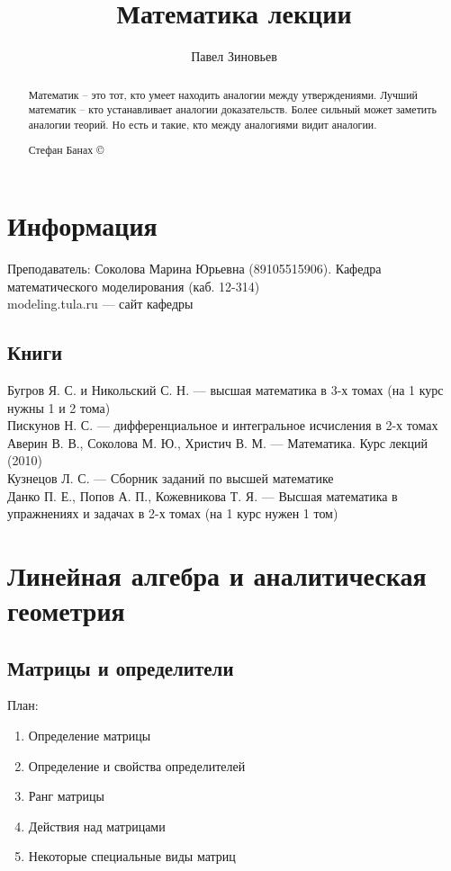 \documentclass[a4paper, 11pt, oneside]{article}
\title{Математика лекции}
\author{Павел Зиновьев}
\begin{document}
\maketitle
\begin{abstract}
	Математик – это тот, кто умеет находить аналогии между утверждениями. Лучший 
	математик – кто устанавливает аналогии доказательств. Более сильный может заметить 
	аналогии теорий. Но есть и такие, кто между аналогиями видит аналогии.
	\begin{flushright}
		 Стефан Банах \copyright
	\end{flushright}
\end{abstract}
\newpage
\tableofcontents
\contentsname
\newpage


\section{Информация}
Преподаватель: Соколова Марина Юрьевна (89105515906). Кафедра математического моделирования (каб. 12-314)\\
modeling.tula.ru --- сайт кафедры
\subsection{Книги}
Бугров Я. С. и Никольский С. Н. --- высшая математика в 3-х томах (на 1 курс нужны 1 и 2 тома)\\
Пискунов Н. С. --- дифференциальное и интегральное исчисления в 2-х томах\\
Аверин В. В., Соколова М. Ю., Христич В. М. --- Математика. Курс лекций (2010)\\
Кузнецов Л. С. --- Сборник заданий по высшей математике\\
Данко П. Е., Попов А. П., Кожевникова Т. Я. --- Высшая математика в упражнениях и задачах в 2-х томах (на 1 курс нужен 1 том)

\section{Линейная алгебра и аналитическая геометрия}
\subsection{Матрицы и определители}
План:
\begin{enumerate}
	\item Определение матрицы
	\item Определение и свойства определителей
	\item Ранг матрицы
	\item Действия над матрицами
	\item Некоторые специальные виды матриц
\end{enumerate}
\end{document}
